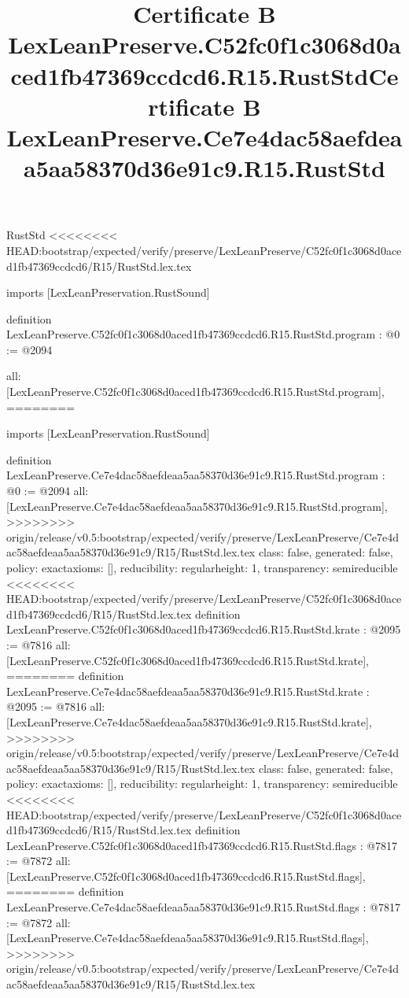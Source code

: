 \begin{lexlean}{RustStd}
<<<<<<<< HEAD:bootstrap/expected/verify/preserve/LexLeanPreserve/C52fc0f1c3068d0aced1fb47369ccdcd6/R15/RustStd.lex.tex
\title{Certificate B LexLeanPreserve.C52fc0f1c3068d0aced1fb47369ccdcd6.R15.RustStd}
\begin{coremodule}
imports [LexLeanPreservation.RustSound]

definition LexLeanPreserve.C52fc0f1c3068d0aced1fb47369ccdcd6.R15.RustStd.program : @0 := @2094 {
  all: [LexLeanPreserve.C52fc0f1c3068d0aced1fb47369ccdcd6.R15.RustStd.program],
========
\title{Certificate B LexLeanPreserve.Ce7e4dac58aefdeaa5aa58370d36e91c9.R15.RustStd}
\begin{coremodule}
imports [LexLeanPreservation.RustSound]

definition LexLeanPreserve.Ce7e4dac58aefdeaa5aa58370d36e91c9.R15.RustStd.program : @0 := @2094 {
  all: [LexLeanPreserve.Ce7e4dac58aefdeaa5aa58370d36e91c9.R15.RustStd.program],
>>>>>>>> origin/release/v0.5:bootstrap/expected/verify/preserve/LexLeanPreserve/Ce7e4dac58aefdeaa5aa58370d36e91c9/R15/RustStd.lex.tex
  class: false,
  generated: false,
  policy: exact{axioms: []},
  reducibility: regular{height: 1},
  transparency: semireducible
}
<<<<<<<< HEAD:bootstrap/expected/verify/preserve/LexLeanPreserve/C52fc0f1c3068d0aced1fb47369ccdcd6/R15/RustStd.lex.tex
definition LexLeanPreserve.C52fc0f1c3068d0aced1fb47369ccdcd6.R15.RustStd.krate : @2095 := @7816 {
  all: [LexLeanPreserve.C52fc0f1c3068d0aced1fb47369ccdcd6.R15.RustStd.krate],
========
definition LexLeanPreserve.Ce7e4dac58aefdeaa5aa58370d36e91c9.R15.RustStd.krate : @2095 := @7816 {
  all: [LexLeanPreserve.Ce7e4dac58aefdeaa5aa58370d36e91c9.R15.RustStd.krate],
>>>>>>>> origin/release/v0.5:bootstrap/expected/verify/preserve/LexLeanPreserve/Ce7e4dac58aefdeaa5aa58370d36e91c9/R15/RustStd.lex.tex
  class: false,
  generated: false,
  policy: exact{axioms: []},
  reducibility: regular{height: 1},
  transparency: semireducible
}
<<<<<<<< HEAD:bootstrap/expected/verify/preserve/LexLeanPreserve/C52fc0f1c3068d0aced1fb47369ccdcd6/R15/RustStd.lex.tex
definition LexLeanPreserve.C52fc0f1c3068d0aced1fb47369ccdcd6.R15.RustStd.flags : @7817 := @7872 {
  all: [LexLeanPreserve.C52fc0f1c3068d0aced1fb47369ccdcd6.R15.RustStd.flags],
========
definition LexLeanPreserve.Ce7e4dac58aefdeaa5aa58370d36e91c9.R15.RustStd.flags : @7817 := @7872 {
  all: [LexLeanPreserve.Ce7e4dac58aefdeaa5aa58370d36e91c9.R15.RustStd.flags],
>>>>>>>> origin/release/v0.5:bootstrap/expected/verify/preserve/LexLeanPreserve/Ce7e4dac58aefdeaa5aa58370d36e91c9/R15/RustStd.lex.tex
}}}
\end{coremodule}}
\end{coremodule}
\end{lexlean}
